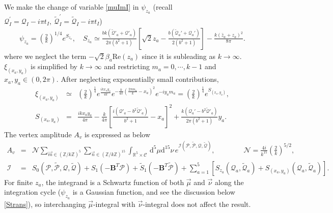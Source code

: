 \documentclass[aps,prd,notitlepage,nofootinbib,superscriptaddress,groupedaddress,twocolumn]{revtex4-1}
\def\be{\begin{eqnarray}}
\def\ee{\end{eqnarray}}
\newcommand{\cc}{\mathcal C}
\newcommand{\ci}{\mathcal I}
\newcommand{\cn}{\mathcal N}
\newcommand{\scrp}{\mathscr{P}}
\renewcommand{\b}{\beta}
\newcommand{\lt}{\left}
\newcommand{\rt}{\right}
\newcommand{\re}{\mathrm{Re}}
\begin{document}
\begin{widetext}
We make the change of variable \eqref{muImI} in $\psi_{z_{a}}$ (recall $\mathscr{Q}_{I}^{\prime}=\mathscr{Q}_{I}-i \pi t_{I}, \ \widetilde{\mathscr{Q}}_{I}^{\prime}=\widetilde{\mathscr{Q}}_{I}-i \pi t_{I}$)
\be
\psi_{z_a}=\left(\frac{2}{k}\right)^{1 / 4} e^{S_{z_a}},\quad 
S_{z_a}\simeq\frac{b k\left(\widetilde{\mathscr{Q}}'_{a}+\mathscr{Q}'_{a}\right)}{2 \pi\left(b^{2}+1\right)}\left[\sqrt{2} z_a-\frac{b \left(\widetilde{\mathscr{Q}}_{a}'+\mathscr{Q}_{a}'\right)}{2 \left(b^{2}+1\right)}\right]-\frac{k(\bar{z}_a+z_a)^{2}}{8 \pi}.
\ee
where we neglect the term $-\sqrt{2}\b_a \re(z_a)$ since it is subleading as $k\to\infty$. $\xi_{(x_a, y_a)}$ is simplified by $k\to\infty$ and restricting $m_a=0,\cdots,k-1$ and $x_a,y_a\in(0,2\pi)$. After neglecting exponentially small contributions,  
\be
\xi_{(x_a, y_a)} &\simeq& \left(\frac{2}{k}\right)^{\frac{1}{4}} e^{\frac{i k x_a y_a}{4 \pi}} e^{-\frac{k}{4 \pi}\left(\frac{2 \pi m_a}{k}-x_a\right)^{2}} e^{-{i } y_a m_a}=\left(\frac{2}{k}\right)^{\frac{1}{4}} e^{S_{(x_a,y_a)}},\\
S_{(x_a,y_a)}&=&\frac{i k x_a y_a}{4 \pi}-\frac{k}{4 \pi}\left[\frac{i \left(\mathscr{Q}'_{a}-b^{2} \widetilde{\mathscr{Q}}'_{a}\right)}{b^{2}+1}-x_a\right]^{2}+ \frac{k\left(\mathscr{Q}_{a}'-b^{2} \widetilde{\mathscr{Q}}'_{a}\right)}{2 \pi\left(b^{2}+1\right)}y_a.
\ee
The vertex amplitude $A_v$ is expressed as below
\be
A_v&=&\cn\sum_{\vec{m} \in(\mathbb{Z} / k \mathbb{Z})^{5}}\sum_{\vec{n} \in(\mathbb{Z} / k \mathbb{Z})^{15}} \int_{\mathbb{R}^{5}\times\mathcal{C}}\,\mathrm{d}^{5} \mu   \mathrm{d}^{15} \nu\, e^{\ci(\scrp, \widetilde{\scrp}, \mathscr{Q}, \widetilde{\mathscr{Q}})},\qquad\qquad
\cn=\frac{4 i}{k^{15}} \left(\frac{2}{k}\right)^{5/2},\\
\ci&=&S_{0}(\scrp, \widetilde{\scrp}, \mathscr{Q}, \widetilde{\mathscr{Q}})+S_{1}\left(-\mathbf{B}^{T} \scrp\right)+\widetilde{S}_{1}\left(-\mathbf{B}^{T} \widetilde{\scrp}\right)+\sum_{a=1}^5\lt[S_{z_a}(\mathscr{Q}_a, \widetilde{\mathscr{Q}}_a)+S_{(x_a,y_a)}(\mathscr{Q}_a, \widetilde{\mathscr{Q}}_a)\rt].\nonumber
\ee
For finite $z_a$, the integrand is a Schwartz function of both $\vec{\mu}$ and $\vec{\nu}$ along the integration cycle ($\psi_{z_a}$ is a Gaussian function, and see the discussion below \eqref{Strans}), so interchanging $\vec{\mu}$-integral with $\vec{\nu}$-integral does not affect the result.

\end{widetext}
\end{document}
